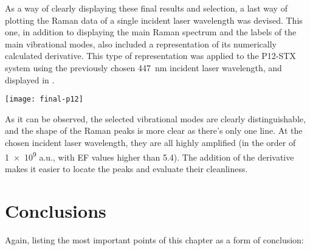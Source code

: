 As a way of clearly displaying these final results and selection, a last way of plotting the Raman data of a single incident laser wavelength was devised.
This one, in addition to displaying the main Raman spectrum and the labels of the main vibrational modes, also included a representation of its numerically calculated derivative.
This type of representation was applied to the P12-STX system using the previously chosen \SI{447}{\nano\meter} incident laser wavelength, and displayed in .

\begin{figure*}[h]
    \texttt{[image: final-p12]}
    \caption[RR spectra of P12-STX at \SI{447}{\nano\metre}]{RR spectra of P12-STX at \SI{447}{\nano\metre}}
\end{figure*}

As it can be observed, the selected vibrational modes are clearly distinguishable, and the shape of the Raman peaks is more clear as there's only one line.
At the chosen incident laser wavelength, they are all highly amplified (in the order of \num{1e9} a.u., with EF values higher than \num{5.4}).
The addition of the derivative makes it easier to locate the peaks and evaluate their cleanliness.


\section{Conclusions}

Again, listing the most important points of this chapter as a form of conclusion:

